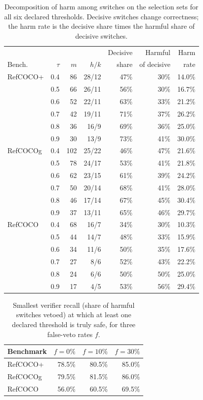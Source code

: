 \begin{table}[t]
\centering
\small
\caption{Decomposition of harm among switches on the selection sets for all six
declared thresholds.  Decisive switches change correctness; the harm rate is the
decisive share times the harmful share of decisive switches.}
\label{tab:decomp-full}
\setlength{\tabcolsep}{3pt}
\begin{tabular}{@{}lrrrrrr@{}}
\toprule
& & & & Decisive & Harmful & Harm \\
Bench. & $\tau$ & $m$ & $h/k$ & share & of decisive & rate \\
\midrule
RefCOCO+ & 0.4 & 86 & 28/12 & 47\% & 30\% & 14.0\% \\
 & 0.5 & 66 & 26/11 & 56\% & 30\% & 16.7\% \\
 & 0.6 & 52 & 22/11 & 63\% & 33\% & 21.2\% \\
 & 0.7 & 42 & 19/11 & 71\% & 37\% & 26.2\% \\
 & 0.8 & 36 & 16/9 & 69\% & 36\% & 25.0\% \\
 & 0.9 & 30 & 13/9 & 73\% & 41\% & 30.0\% \\
\midrule
RefCOCOg & 0.4 & 102 & 25/22 & 46\% & 47\% & 21.6\% \\
 & 0.5 & 78 & 24/17 & 53\% & 41\% & 21.8\% \\
 & 0.6 & 62 & 23/15 & 61\% & 39\% & 24.2\% \\
 & 0.7 & 50 & 20/14 & 68\% & 41\% & 28.0\% \\
 & 0.8 & 46 & 17/14 & 67\% & 45\% & 30.4\% \\
 & 0.9 & 37 & 13/11 & 65\% & 46\% & 29.7\% \\
\midrule
RefCOCO & 0.4 & 68 & 16/7 & 34\% & 30\% & 10.3\% \\
 & 0.5 & 44 & 14/7 & 48\% & 33\% & 15.9\% \\
 & 0.6 & 34 & 11/6 & 50\% & 35\% & 17.6\% \\
 & 0.7 & 27 & 8/6 & 52\% & 43\% & 22.2\% \\
 & 0.8 & 24 & 6/6 & 50\% & 50\% & 25.0\% \\
 & 0.9 & 17 & 4/5 & 53\% & 56\% & 29.4\% \\
\bottomrule
\end{tabular}
\end{table}

\begin{table}[t]
\centering
\small
\caption{Smallest verifier recall (share of harmful switches vetoed) at which at
least one declared threshold is truly safe, for three false-veto rates $f$.}
\label{tab:min-recall}
\begin{tabular}{@{}lrrr@{}}
\toprule
Benchmark & $f=0\%$ & $f=10\%$ & $f=30\%$ \\
\midrule
RefCOCO+ & 78.5\% & 80.5\% & 85.0\% \\
RefCOCOg & 79.5\% & 81.5\% & 86.0\% \\
RefCOCO & 56.0\% & 60.5\% & 69.5\% \\
\bottomrule
\end{tabular}
\end{table}

